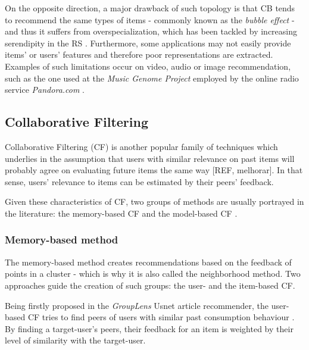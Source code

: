     On the opposite direction, a major drawback of such topology is that CB tends to recommend the same types of items - commonly known as the \textit{bubble effect} - and thus it suffers from overspecialization, which has been tackled by increasing serendipity in the RS \cite{10.1109/HIS.2008.25}. Furthermore, some applications may not easily provide items' or users' features and therefore poor representations are extracted. Examples of such limitations occur on video, audio or image recommendation, such as the one used at the \textit{Music Genome Project} employed by the online radio service \textit{Pandora.com}  \cite{2009MFTechniques}.

\subsection{Collaborative Filtering}
\label{sec:CF}

    Collaborative Filtering (CF)  is another popular family of techniques which underlies in the assumption     that users with similar relevance on past items will probably agree on evaluating future items the same way [REF, melhorar]. In that sense, users' relevance to items can be estimated by their peers' feedback.

    Given these characteristics of CF, two groups of methods are usually portrayed in the literature: the memory-based CF and the model-based CF \cite{2010Handbook}. 

  \subsubsection{Memory-based method}

    The memory-based method creates recommendations based on the feedback of points in a cluster - which is why it is also called the neighborhood method. Two approaches guide the creation of such groups: the user- and the item-based CF.
    
    
    Being firstly proposed in the \textit{GroupLens} Usnet article recommender, the user-based CF tries to find peers of users with similar past consumption behaviour \cite{10.1145/192844.192905}. By finding a target-user's peers, their feedback for an item is weighted by their level of similarity with the target-user.
    
